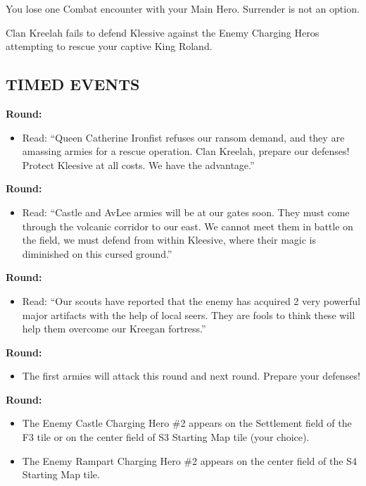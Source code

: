 \begin{multicols*}{2}
You lose one Combat encounter with your Main Hero. Surrender is not an option.

Clan Kreelah fails to defend Klessive against the Enemy Charging Heros attempting to rescue your captive King Roland.

\subsection*{\MakeUppercase{Timed Events}}

\textbf{ Round:}
\begin{itemize}
  \item Read: ``Queen Catherine Ironfist refuses our ransom demand, and they are amassing armies for a rescue
    operation. Clan Kreelah, prepare our defenses! Protect Kleesive at all costs. We have the advantage.''
\end{itemize}

\textbf{ Round:}
\begin{itemize}
  \item Read: ``Castle and AvLee armies will be at our gates soon. They must come through the volcanic corridor
    to our east. We cannot meet them in battle on the field, we must defend from within Kleesive, where
    their magic is diminished on this cursed ground.''
\end{itemize}

\textbf{ Round:}
\begin{itemize}
  \item Read: ``Our scouts have reported that the enemy has acquired 2 very powerful major artifacts with the
    help of local seers. They are fools to think these will help them overcome our Kreegan fortress.”
\end{itemize}

\textbf{ Round:}
\begin{itemize}
  \item The first armies will attack this round and next round. Prepare your defenses!
\end{itemize}

\textbf{ Round:}
\begin{itemize}
  \item The Enemy Castle Charging Hero \#2 appears on the Settlement field of the F3 tile or on the center field of S3 Starting Map tile (your choice).
  \item The Enemy Rampart Charging Hero \#2 appears on the center field of the S4 Starting Map tile.
\end{itemize}


\end{multicols*}
